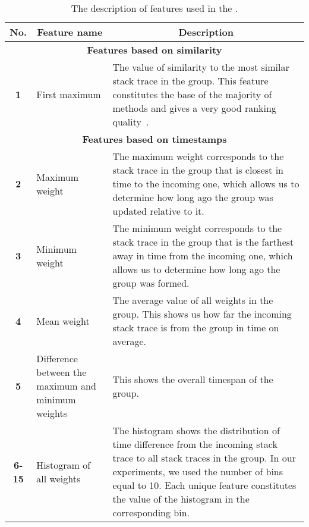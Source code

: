 \begin{table*}[]
\centering
\caption{The description of features used in the \ag.}
\begin{tabular}{cp{4cm}p{12cm}}
\toprule

  \textbf{No.} &\multicolumn{1}{c}{\textbf{Feature name}} &
  \multicolumn{1}{c}{\textbf{Description}}  \\ 
  \midrule\midrule
  
  \multicolumn{3}{c}{\textbf{Features based on similarity}}\\\midrule\midrule

  \textbf{1} & First maximum & The value of similarity to the most similar stack trace in the group. This feature constitutes the base of the majority of methods and gives a very good ranking quality~\cite{lerch, durfex, s3m}.
  \\\midrule\midrule
  
  \multicolumn{3}{c}{\textbf{Features based on timestamps}}
  \\\midrule\midrule

  \textbf{2} & Maximum weight & The maximum weight corresponds to the stack trace in the group that is closest in time to the incoming one, which allows us to determine how long ago the group was updated relative to it. \\\midrule
  
  \textbf{3} & Minimum weight & The minimum weight corresponds to the stack trace in the group that is the farthest away in time from the incoming one, which allows us to determine how long ago the group was formed.
  \\\midrule
  
  \textbf{4} & Mean weight & The average value of all weights in the group. This shows us how far the incoming stack trace is from the group in time on average.
  \\\midrule
  
  \textbf{5} & Difference between the maximum and minimum weights & This shows the overall timespan of the group.
  \\\midrule

  \textbf{6-15} & Histogram of all weights & The histogram shows the distribution of time difference from the incoming stack trace to all stack traces in the group. In our experiments, we used the number of bins equal to 10. Each unique feature constitutes the value of the histogram in the corresponding bin. 
  \\\midrule\midrule
  

\end{tabular}
\end{table*}
